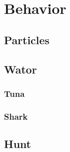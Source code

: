 \section{Behavior}
\label{sec:Behavior}
\subsection{Particles}
\subsection{Wator}
\subsubsection{Tuna}
\subsubsection{Shark}
\subsection{Hunt}